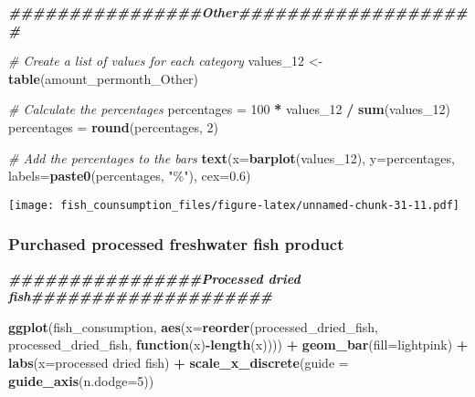 \documentclass[
]{article}
\newenvironment{Shaded}{\begin{snugshade}}{\end{snugshade}}
\newcommand{\AttributeTok}[1]{\textcolor[rgb]{0.13,0.29,0.53}{#1}}
\newcommand{\CommentTok}[1]{\textcolor[rgb]{0.56,0.35,0.01}{\textit{#1}}}
\newcommand{\ControlFlowTok}[1]{\textcolor[rgb]{0.13,0.29,0.53}{\textbf{#1}}}
\newcommand{\DecValTok}[1]{\textcolor[rgb]{0.00,0.00,0.81}{#1}}
\newcommand{\DocumentationTok}[1]{\textcolor[rgb]{0.56,0.35,0.01}{\textbf{\textit{#1}}}}
\newcommand{\FloatTok}[1]{\textcolor[rgb]{0.00,0.00,0.81}{#1}}
\newcommand{\FunctionTok}[1]{\textcolor[rgb]{0.13,0.29,0.53}{\textbf{#1}}}
\newcommand{\NormalTok}[1]{#1}
\newcommand{\OtherTok}[1]{\textcolor[rgb]{0.56,0.35,0.01}{#1}}
\newcommand{\SpecialCharTok}[1]{\textcolor[rgb]{0.81,0.36,0.00}{\textbf{#1}}}
\newcommand{\StringTok}[1]{\textcolor[rgb]{0.31,0.60,0.02}{#1}}
\begin{document}
\begin{Shaded}
\begin{Highlighting}[]
\DocumentationTok{\#\#\#\#\#\#\#\#\#\#\#\#\#\#\#\#Other\#\#\#\#\#\#\#\#\#\#\#\#\#\#\#\#\#\#\#\#}

\CommentTok{\# Create a list of values for each category}
\NormalTok{values\_12 }\OtherTok{\textless{}{-}} \FunctionTok{table}\NormalTok{(amount\_permonth\_Other)}

\CommentTok{\# Calculate the percentages}
\NormalTok{percentages }\OtherTok{=} \DecValTok{100} \SpecialCharTok{*}\NormalTok{ values\_12 }\SpecialCharTok{/} \FunctionTok{sum}\NormalTok{(values\_12)}
\NormalTok{percentages }\OtherTok{=} \FunctionTok{round}\NormalTok{(percentages, }\DecValTok{2}\NormalTok{)}

\CommentTok{\# Add the percentages to the bars}
\FunctionTok{text}\NormalTok{(}\AttributeTok{x=}\FunctionTok{barplot}\NormalTok{(values\_12), }\AttributeTok{y=}\NormalTok{percentages, }\AttributeTok{labels=}\FunctionTok{paste0}\NormalTok{(percentages, }\StringTok{"\%"}\NormalTok{), }\AttributeTok{cex=}\FloatTok{0.6}\NormalTok{)}
\end{Highlighting}
\end{Shaded}

\texttt{[image: fish\_counsumption\_files/figure-latex/unnamed-chunk-31-11.pdf]}

\hypertarget{purchased-processed-freshwater-fish-product}{%
\subsubsection{Purchased processed freshwater fish
product}\label{purchased-processed-freshwater-fish-product}}

\begin{Shaded}
\begin{Highlighting}[]
\DocumentationTok{\#\#\#\#\#\#\#\#\#\#\#\#\#\#\#\#Processed dried fish\#\#\#\#\#\#\#\#\#\#\#\#\#\#\#\#\#\#\#\#}

\FunctionTok{ggplot}\NormalTok{(fish\_consumption, }\FunctionTok{aes}\NormalTok{(}\AttributeTok{x=}\FunctionTok{reorder}\NormalTok{(processed\_dried\_fish, processed\_dried\_fish, }\ControlFlowTok{function}\NormalTok{(x)}\SpecialCharTok{{-}}\FunctionTok{length}\NormalTok{(x)))) }\SpecialCharTok{+}
  \FunctionTok{geom\_bar}\NormalTok{(}\AttributeTok{fill=}\StringTok{\textquotesingle{}lightpink\textquotesingle{}}\NormalTok{) }\SpecialCharTok{+} 
  \FunctionTok{labs}\NormalTok{(}\AttributeTok{x=}\StringTok{\textquotesingle{}processed dried fish\textquotesingle{}}\NormalTok{) }\SpecialCharTok{+}
  \FunctionTok{scale\_x\_discrete}\NormalTok{(}\AttributeTok{guide =} \FunctionTok{guide\_axis}\NormalTok{(}\AttributeTok{n.dodge=}\DecValTok{5}\NormalTok{))}
\end{Highlighting}
\end{Shaded}
\end{document}
